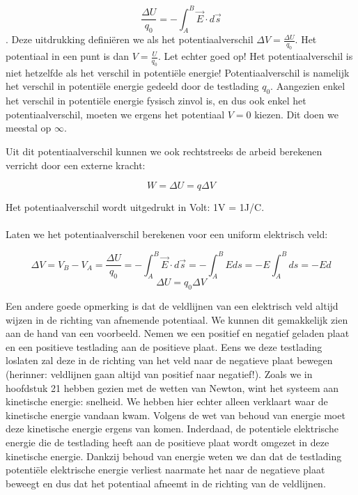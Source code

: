 \documentclass[12pt,a4paper]{article}
\begin{document}
    $$\frac{\Delta U}{q_{0}} = -\int_{A}^{B} \vec{E} \cdot d\vec{s}$$. Deze uitdrukking definiëren we als het
    potentiaalverschil $\Delta V = \frac{\Delta U}{q_{0}}$. Het potentiaal in een punt is dan $V = \frac{U}{q_{0}}$. Let echter goed op! Het potentiaalverschil
    is niet hetzelfde als het verschil in potentiële energie! Potentiaalverschil is namelijk het verschil in potentiële energie
    gedeeld door de testlading $q_{0}$. Aangezien enkel het verschil in potentiële energie fysisch zinvol is, en dus ook
    enkel het potentiaalverschil, moeten we ergens het potentiaal $V = 0$ kiezen. Dit doen we meestal op $\infty$. 
    
    Uit dit potentiaalverschil kunnen we ook rechtstreeks de arbeid berekenen verricht door een externe kracht:
    
    $$W = \Delta U = q\Delta V$$
    
    Het potentiaalverschil wordt uitgedrukt in Volt: 1V = 1J/C.\\
    \\
    Laten we het potentiaalverschil berekenen voor een uniform elektrisch veld:
    
    $$\Delta V = V_{B} - V_{A} = \frac{\Delta U}{q_{0}} = -\int_{A}^{B} \vec{E} \cdot d\vec{s} = -\int_{A}^{B} Eds = -E\int_{A}^{B} ds = -Ed$$
    $$\Delta U = q_{0} \Delta V$$
    
    Een andere goede opmerking is dat de veldlijnen van een elektrisch veld altijd wijzen in de richting van afnemende potentiaal. We kunnen dit gemakkelijk zien
    aan de hand van een voorbeeld. Nemen we een positief en negatief geladen plaat en een positieve testlading aan de positieve plaat. Eens we deze testlading
    loslaten zal deze in de richting van het veld naar de negatieve plaat bewegen (herinner: veldlijnen gaan altijd van positief naar negatief!). Zoals we in 
    hoofdstuk 21 hebben gezien met de wetten van Newton, wint het systeem aan kinetische energie: snelheid. We hebben hier echter alleen verklaart
    waar de kinetische energie vandaan kwam. Volgens de wet van behoud van energie moet deze kinetische energie ergens van komen. Inderdaad,
    de potentiele elektrische energie die de testlading heeft aan de positieve plaat wordt omgezet in deze kinetische energie. Dankzij behoud van energie weten we dan 
    dat de testlading potentiële elektrische energie verliest naarmate het naar de negatieve plaat beweegt en dus dat het potentiaal afneemt in de richting van de 
    veldlijnen. \\
    
\end{document}

